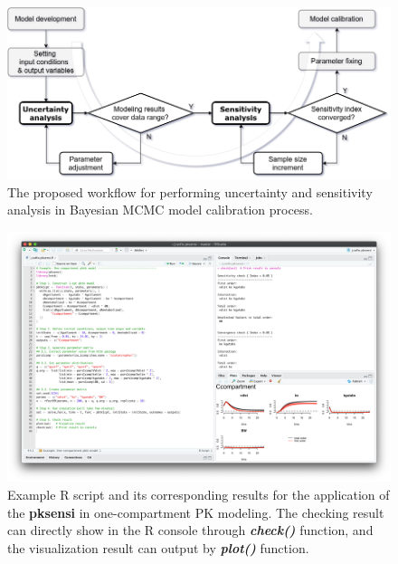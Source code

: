 \documentclass[preprint,12pt, a4paper]{elsarticle}
\begin{document}
\begin{landscape}

\begin{figure}
\includegraphics[width=1\linewidth]{workflow} 
\caption{The proposed workflow for performing uncertainty and sensitivity analysis in Bayesian MCMC model calibration process.}
\label{fig:workflow}
\end{figure}

\clearpage
\newpage

\begin{figure}
\includegraphics[width=1\linewidth]{example-1} 
\caption{Example R script and its corresponding results for the application of the \textbf{pksensi} in one-compartment PK modeling. The checking result can directly show in the R console through \textit{\textbf{check()}} function, and the visualization result can output by \textit{\textbf{plot()}} function.}
\label{fig:example-1}
\end{figure}

\clearpage
\newpage


\end{landscape}
\end{document}
